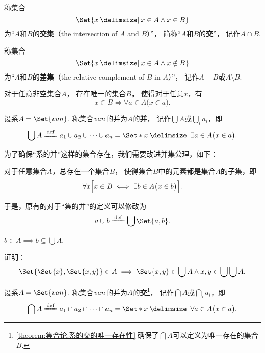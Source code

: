 \begin{definition}
称集合\[
\Set{ x \given x \in A \land x \in B }
\]为“\(A\)和\(B\)的\textbf{交集}（the intersection of \(A\) and \(B\)）”，%
简称“\(A\)和\(B\)的\textbf{交}”，%
记作\(A \cap B\).
\end{definition}

\begin{definition}
称集合\[
\Set{ x \given x \in A \land x \notin B }
\]为“\(A\)和\(B\)的\textbf{差集}（the relative complement of \(B\) in \(A\)）”，%
记作\(A - B\)或\(A \setminus B\).
\end{definition}

\begin{theorem}\label{theorem:集合论.系的交的唯一存在性}
对于任意非空集合\(A\)，%
存在唯一的集合\(B\)，%
使得对于任意\(x\)，有\[
x \in B
\iff
\forall a \in A \bigl( x \in a \bigr).
\]
\end{theorem}

\begin{definition}
设系\(A = \Set{\v{a}{n}}\).
称集合\(v{a}{n}\)的并为\(A\)的\textbf{并}，%
记作\(\bigcup A\)或\(\bigcup\limits_i a_i\)，即\[
\bigcup A
\defeq
a_1 \cup a_2 \cup \dotsb \cup a_n
= \Set*{ x \given \exists a \in A \bigl( x \in a \bigr) }.
\]
\end{definition}

为了确保“系的并”这样的集合存在，我们需要改进并集公理，如下：
\begin{axiom}[并集公理II]
对于任意集合\(A\)，总存在一个集合\(B\)，%
使得集合\(B\)中的元素都是集合\(A\)的子集，即\[
\forall x \Bigl[
	x \in B
	\iff
	\exists b \in A \bigl( x \in b \bigr)
\Bigr].
\]
\end{axiom}

于是，原有的对于“集的并”的定义可以修改为\[
a \cup b \defeq \bigcup\Set{a,b}.
\]

\begin{property}
\(b \in A \implies b \subseteq \bigcup A\).
\end{property}

\begin{example}
证明：
\begin{equation}
\Set{ \Set{x}, \Set{x,y} } \in A
\implies
\Set{x,y} \in \bigcup A
\land
x,y \in \bigcup\bigcup A.
\end{equation}
\end{example}

\begin{definition}
设系\(A = \Set{\v{a}{n}}\).
称集合\(v{a}{n}\)的并为\(A\)的\textbf{交}\footnote{%
\cref{theorem:集合论.系的交的唯一存在性} 确保了\(\bigcap A\)可以定义为唯一存在的集合\(B\).
}，%
记作\(\bigcap A\)或\(\bigcap\limits_i a_i\)，即\[
\bigcap A
\defeq
a_1 \cap a_2 \cap \dotsb \cap a_n
= \Set*{ x \given \forall a \in A \bigl(x \in a\bigr) }.
\]
\end{definition}

